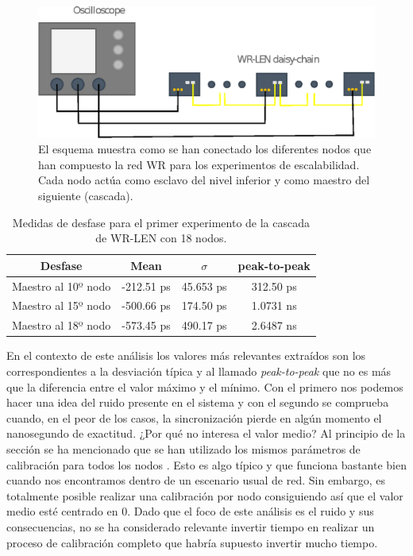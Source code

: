 \begin{figure}
	\centering
	\includegraphics[width=0.7\linewidth]{imagenes/chain_schema}
	\caption[Esquema de conexión para los experimentos de escalabilidad.]{El 
	esquema muestra como se han conectado los diferentes nodos que han 
	compuesto la red WR para los experimentos de escalabilidad. Cada nodo actúa 
	como esclavo del nivel inferior y como maestro del siguiente (cascada).}
	\label{fig:chainschema}
\end{figure}

\begin{table}
	\renewcommand{\arraystretch}{1.3}
	\caption{Medidas de desfase para el primer experimento de la cascada de 
	WR-LEN con 18 nodos.}
	\label{tab:cascada1}
	\centering
	\begin{tabular}{|c||c||c||c|}
		\hline
		Desfase & Mean & $\sigma$ & peak-to-peak \\
		\hline
		Maestro al 10º nodo & -212.51 ps & 45.653 ps & 312.50 ps \\
		\hline
		Maestro al 15º nodo & -500.66 ps & 174.50 ps & 1.0731 ns \\
		\hline
		Maestro al 18º nodo & -573.45 ps & 490.17 ps & 2.6487 ns \\
		\hline
	\end{tabular}
\end{table}

En el contexto de este análisis los valores más relevantes extraídos son los 
correspondientes a la desviación típica y al llamado \textit{peak-to-peak} que 
no es más que la diferencia entre el valor máximo y el mínimo. Con el primero 
nos podemos hacer una idea del ruido presente en el sistema y con el segundo se 
comprueba cuando, en el peor de los casos, la sincronización pierde en algún 
momento el nanosegundo de exactitud. ¿Por qué no interesa el valor medio? Al 
principio de la sección se ha mencionado que se han utilizado los mismos 
parámetros de calibración para todos los nodos . Esto es algo típico y que 
funciona bastante bien cuando nos encontramos dentro de un escenario usual de 
red. Sin embargo, es totalmente posible realizar una calibración por nodo 
consiguiendo así que el valor medio esté centrado en 0. Dado que el foco de 
este análisis es el ruido y sus consecuencias, no se ha considerado relevante 
invertir tiempo en realizar un proceso de calibración completo que habría 
supuesto invertir mucho tiempo.

